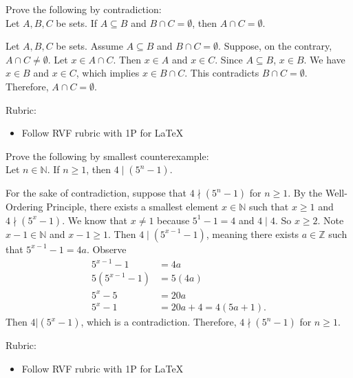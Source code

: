 \documentclass{article}
\newcommand{\Z}{\mathbb{Z}}
\theoremstyle{definition}
\begin{document}
\begin{question}
    Prove the following by contradiction:\\
    Let $A, B, C$ be sets. If $A\subseteq B$ and $B\cap C=\emptyset$, then $A\cap C=\emptyset$.
\end{question}
\begin{solution}
      Let $A, B, C$ be sets. Assume $A\subseteq B$ and $B\cap C=\emptyset$. Suppose, on the contrary, $A\cap C\neq\emptyset$. Let $x\in A\cap C$. Then $x\in A$ and $x\in C$. Since $A\subseteq B$, $x\in B$. We have $x\in B$ and $x\in C$, which implies $x \in B\cap C$. This contradicts $B\cap C=\emptyset$. Therefore, $A\cap C=\emptyset$.
	
{\color{red} Rubric:
\begin{itemize}
\item Follow RVF rubric with 1P for \LaTeX
\end{itemize}}
\end{solution}


\begin{question}
    Prove the following by smallest counterexample:\\
    Let $n\in \mathbb{N}$. If $n\geq 1$, then $4 \mid (5^n-1)$.
\end{question}
\begin{solution}
      For the sake of contradiction, suppose that $4 \nmid (5^n-1)$ for $n\geq 1$. By the Well-Ordering Principle, there exists a smallest element $x\in \mathbb{N}$ such that $x\geq 1$ and $4 \nmid (5^x-1)$. We know that $x\neq 1$ because $5^1-1=4$ and $4\mid 4$. So $x\geq 2$. Note $x-1\in \mathbb{N}$ and $x-1\geq 1$. Then $4\mid (5^{x-1}-1)$, meaning there exists $a\in \Z$ such that $5^{x-1}-1 = 4a$. Observe
      \begin{align*}
      5^{x-1}-1 &= 4a\\
      5(5^{x-1}-1) &= 5(4a)\\
      5^x - 5 &= 20a\\
      5^x -1 &= 20a +4 = 4(5a+1).
      \end{align*}
      Then $4|(5^x-1)$, which is a contradiction. Therefore, $4 \nmid (5^n-1)$ for $n\geq 1$.
{\color{red} Rubric:
\begin{itemize}
\item Follow RVF rubric with 1P for \LaTeX
\end{itemize}}
\end{solution}
\end{document}
